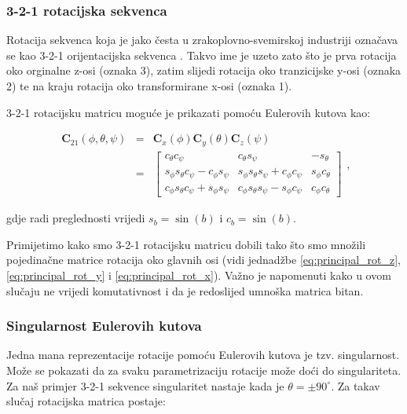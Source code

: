 \documentclass[times, utf8, diplomski, numeric]{templates/template}
\begin{document}
{{{            \subsubsection{3-2-1 rotacijska sekvenca}{
                Rotacija sekvenca koja je jako česta u zrakoplovno-svemirskoj industriji označava se kao 3-2-1 orijentacijska sekvenca . Takvo ime je uzeto zato što je prva rotacija oko orginalne z-osi (oznaka 3), zatim slijedi rotacija oko tranzicijske y-osi (oznaka 2) te na kraju rotacija oko transformirane x-osi (oznaka 1).

                3-2-1 rotacijsku matricu moguće je prikazati pomoću Eulerovih kutova kao:

                \begin{equation}
                \label{eq:euler_rot_mat}
                \begin{array}{rcl}
                \textbf{C}_{21}(\phi, \theta, \psi) & = & \textbf{C}_{x}(\phi) \textbf{C}_{y}(\theta) \textbf{C}_{z}(\psi) \\
                & = &
                \begin{bmatrix}
                    c_{\theta}c_{\psi}                            & c_{\theta}s_{\psi}                            & -s_{\theta} \\
                    s_{\phi}s_{\theta}c_{\psi} - c_{\phi}s_{\psi} & s_{\phi}s_{\theta}s_{\psi} + c_{\phi}c_{\psi} & s_{\phi}c_{\theta} \\
                    c_{\phi}s_{\theta}c_{\psi} + s_{\phi}s_{\psi} & c_{\phi}s_{\theta}s_{\psi} - s_{\phi}c_{\psi} & c_{\phi}c_{\theta}
                \end{bmatrix}
                \end{array}
                ,
                \end{equation}

                gdje radi preglednosti vrijedi $s_{b}=\sin(b)$ i $c_{b}=\sin(b)$.

                Primijetimo kako smo 3-2-1 rotacijsku matricu dobili tako što smo množili pojedinačne matrice rotacija oko glavnih osi (vidi jednadžbe \ref{eq:principal_rot_z}, \ref{eq:principal_rot_y} i \ref{eq:principal_rot_x}). Važno je napomenuti kako u ovom slučaju ne vrijedi komutativnost i da je redoslijed umnoška matrica bitan.
            }

            \subsubsection{Singularnost Eulerovih kutova}{
            \label{subsubsection:singularnost_eulerovih_kutova}
                Jedna mana reprezentacije rotacije pomoću Eulerovih kutova je tzv. singularnost. Može se pokazati da za svaku parametrizaciju rotacije može doći do singulariteta. Za naš primjer 3-2-1 sekvence singularitet nastaje kada je $\theta=\pm90^{\circ}$. Za takav slučaj rotacijska matrica postaje:

}}}}
\end{document}
